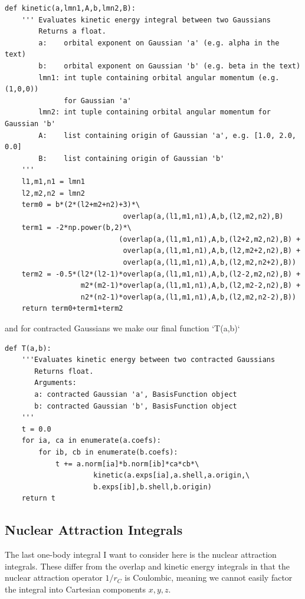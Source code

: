 \begin{lstlisting}[style=MyPython]
def kinetic(a,lmn1,A,b,lmn2,B):
    ''' Evaluates kinetic energy integral between two Gaussians
        Returns a float.
        a:    orbital exponent on Gaussian 'a' (e.g. alpha in the text)
        b:    orbital exponent on Gaussian 'b' (e.g. beta in the text)
        lmn1: int tuple containing orbital angular momentum (e.g. (1,0,0))
              for Gaussian 'a'
        lmn2: int tuple containing orbital angular momentum for Gaussian 'b'
        A:    list containing origin of Gaussian 'a', e.g. [1.0, 2.0, 0.0]
        B:    list containing origin of Gaussian 'b'
    '''
    l1,m1,n1 = lmn1
    l2,m2,n2 = lmn2
    term0 = b*(2*(l2+m2+n2)+3)*\
                            overlap(a,(l1,m1,n1),A,b,(l2,m2,n2),B)
    term1 = -2*np.power(b,2)*\
                           (overlap(a,(l1,m1,n1),A,b,(l2+2,m2,n2),B) +
                            overlap(a,(l1,m1,n1),A,b,(l2,m2+2,n2),B) +
                            overlap(a,(l1,m1,n1),A,b,(l2,m2,n2+2),B))
    term2 = -0.5*(l2*(l2-1)*overlap(a,(l1,m1,n1),A,b,(l2-2,m2,n2),B) +
                  m2*(m2-1)*overlap(a,(l1,m1,n1),A,b,(l2,m2-2,n2),B) +
                  n2*(n2-1)*overlap(a,(l1,m1,n1),A,b,(l2,m2,n2-2),B))
    return term0+term1+term2
\end{lstlisting}

and for contracted Gaussians we make our final function `T(a,b)`

\begin{lstlisting}[style=MyPython]
def T(a,b):
    '''Evaluates kinetic energy between two contracted Gaussians
       Returns float.
       Arguments:
       a: contracted Gaussian 'a', BasisFunction object
       b: contracted Gaussian 'b', BasisFunction object
    '''
    t = 0.0
    for ia, ca in enumerate(a.coefs):
        for ib, cb in enumerate(b.coefs):
            t += a.norm[ia]*b.norm[ib]*ca*cb*\
                     kinetic(a.exps[ia],a.shell,a.origin,\
                     b.exps[ib],b.shell,b.origin)
    return t
\end{lstlisting}

\subsection{Nuclear Attraction Integrals}

The last one-body integral I want to consider here is the nuclear
attraction integrals. These differ from the overlap and kinetic energy
integrals in that the nuclear attraction operator $1/r_C$ is Coulombic,
meaning we cannot easily factor the integral into Cartesian components
$x,y,z$.


